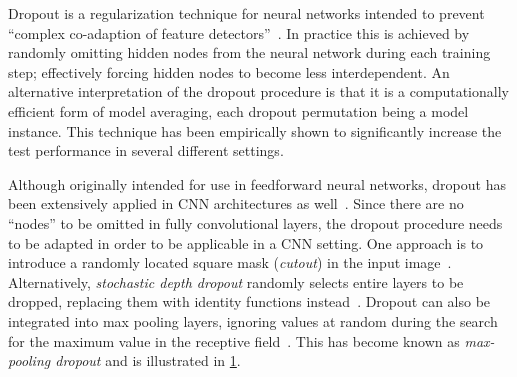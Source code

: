 Dropout is a regularization technique for neural networks intended to prevent \enquote{complex co-adaption of feature detectors}~\cite{dropout-original-paper}.
In practice this is achieved by randomly omitting hidden nodes from the neural network during each training step; effectively forcing hidden nodes to become less interdependent.
An alternative interpretation of the dropout procedure is that it is a computationally efficient form of model averaging, each dropout permutation being a model instance.
This technique has been empirically shown to significantly increase the test performance in several different settings.

Although originally intended for use in feedforward neural networks, dropout has been extensively applied in CNN architectures as well~\cite{dropout-cnn}.
Since there are no \enquote{nodes} to be omitted in fully convolutional layers, the dropout procedure needs to be adapted in order to be applicable in a CNN setting.
One approach is to introduce a randomly located square mask (\textit{cutout}) in the input image~\cite{dropout-cutout}.
Alternatively, \textit{stochastic depth dropout} randomly selects entire layers to be dropped, replacing them with identity functions instead~\cite{dropout-stochastic-depth}.
Dropout can also be integrated into max pooling layers, ignoring values at random during the search for the maximum value in the receptive field~\cite{max-pooling-dropout}.
This has become known as \textit{max-pooling dropout} and is illustrated in \cref{fig:max-pooling-dropout}.

\begin{figure}[H]
  
  \label{fig:max-pooling-dropout}
\end{figure}
